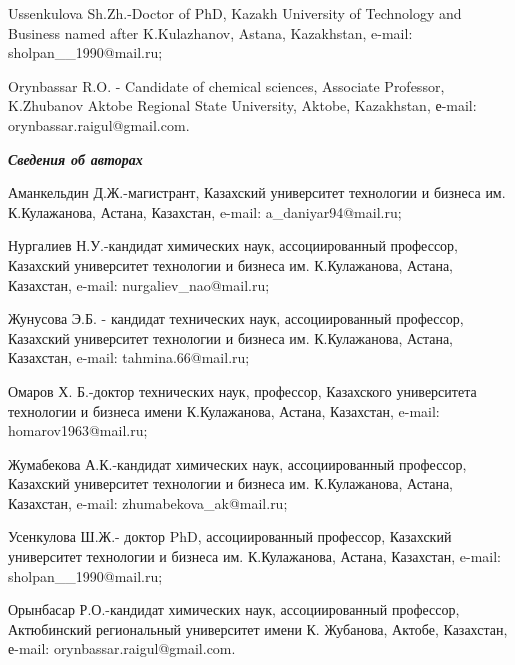 Ussenkulova Sh.Zh.-Doctor of PhD, Kazakh University of Technology and
Business named after K.Kulazhanov, Astana, Kazakhstan, e-mail:
sholpan\_\_1990@mail.ru;

Orynbassar R.O. - Candidate of chemical sciences, Associate Professor,
K.Zhubanov Aktobe Regional State University, Aktobe, Kazakhstan, е-mail:
orynbassar.raigul@gmail.com.

\emph{{\bfseries Сведения об авторах}}

Аманкельдин Д.Ж.-магистрант, Казахский университет технологии и бизнеса
им. К.Кулажанова, Астана, Казахстан, e-mail: a\_daniyar94@mail.ru;

Нургалиев Н.У.-кандидат химических наук, ассоциированный профессор,
Казахский университет технологии и бизнеса им. К.Кулажанова, Астана,
Казахстан, e-mail: nurgaliev\_nao@mail.ru;

Жунусова Э.Б. - кандидат технических наук, ассоциированный профессор,
Казахский университет технологии и бизнеса им. К.Кулажанова, Астана,
Казахстан, e-mail: tahmina.66@mail.ru;

Омаров Х. Б.-доктор технических наук, профессор, Казахского университета
технологии и бизнеса имени К.Кулажанова, Астана, Казахстан, e-mail:
homarov1963@mail.ru;

Жумабекова А.К.-кандидат химических наук, ассоциированный профессор,
Казахский университет технологии и бизнеса им. К.Кулажанова, Астана,
Казахстан, e-mail: zhumabekova\_ak@mail.ru;

Усенкулова Ш.Ж.- доктор PhD, ассоциированный профессор, Казахский
университет технологии и бизнеса им. К.Кулажанова, Астана, Казахстан,
e-mail: sholpan\_\_1990@mail.ru;

Орынбасар Р.О.-кандидат химических наук, ассоциированный профессор,
Актюбинский региональный университет имени К. Жубанова, Актобе,
Казахстан, е-mail: orynbassar.raigul@gmail.com.
